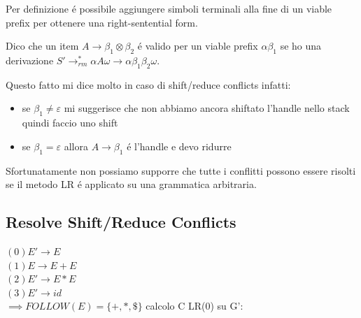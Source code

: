 Per definizione \'e possibile aggiungere simboli terminali alla fine di un viable prefix per ottenere una right-sentential form.

Dico che un item $A \rightarrow \beta_1 \otimes \beta_2$ \'e valido per un viable prefix $\alpha\beta_1$ se ho una derivazione 
$S' \rightarrow^*_{rm} \alpha A\omega \rightarrow \alpha \beta_1\beta_2\omega$.

Questo fatto mi dice molto in caso di shift/reduce conflicts infatti:\\ 
\begin{itemize}
    \item se $\beta_1 \not = \varepsilon$ mi suggerisce che non abbiamo ancora shiftato l'handle nello stack quindi faccio uno shift\\
    \item se $\beta_1 = \varepsilon $ allora $A \rightarrow \beta_1$ \'e l'handle e devo ridurre\\
\end{itemize}
 
Sfortunatamente non possiamo supporre che tutte i conflitti possono essere risolti se il metodo LR \'e applicato su una grammatica 
arbitraria.

\subsection{Resolve Shift/Reduce Conflicts}
$(0) E' \rightarrow E $\\
$(1) E \rightarrow E + E$\\
$(2) E' \rightarrow E * E $\\
$(3) E' \rightarrow id $\\
$\implies FOLLOW(E)=\{ +,*,\$\}$ calcolo C LR(0) su G':

